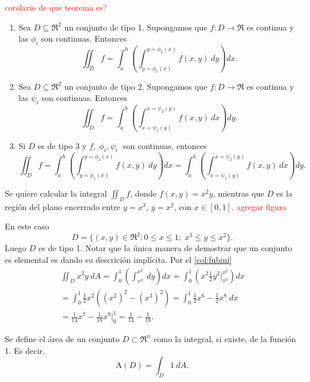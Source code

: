 \begin{corollary} \label{col:fubini}
    \textcolor{red}{corolario de que teorema es?}
    \begin{enumerate}
        \item Sea $D\subseteq\Re^2$ un conjunto de tipo 1. Supongamos que $f:D\to\Re$ es continua y las $\phi_i$ son continuas. Entonces
        \[
            \iint_D f=\int_a^b\left(\int_{y=\phi_1(x)}^{y=\phi_2(x)}f(x,y)\:dy\right)dx.  
        \]
        \item Sea $D\subseteq\Re^2$ un conjunto de tipo 2. Supongamos que $f:D\to\Re$ es continua y las $\psi_i$ son continuas. Entonces
        \[
            \iint_D f=\int_a^b\left(\int_{x=\psi_1(y)}^{x=\psi_2(y)}f(x,y)\:dx\right)dy.  
        \]
        \item Si $D$ es de tipo 3 y $f,\;\phi_i,\psi_i\;$ son continuas, entonces 
        \[
            \iint_D f=\int_a^b\left(\int_{y=\phi_1(x)}^{y=\phi_2(x)}f(x,y)\:dy\right)dx=\int_a^b\left(\int_{x=\psi_1(y)}^{x=\psi_2(y)}f(x,y)\:dx\right)dy. 
        \]
    \end{enumerate}
\end{corollary}
\begin{example}
    Se quiere calcular la integral $\iint_D f$, donde $f(x,y)=x^2y$, mientras que $D$ es la regi\'on del plano encerrado entre $y=x^3$, $y=x^2$, con $x\in[0,1]$. \textcolor{red}{agregar figura}

    En este caso 
    \[
        D=\{(x,y)\in\Re^2:0\leq x\leq1;\;x^3\leq y\leq x^2\}.  
    \]
    Luego $D$ es de tipo 1. Notar que la \'unica manera de demostrar que un conjunto es elemental es dando su descrici\'on impl\'icita. Por el \autoref{col:fubini}
    \begin{gather*}
        \iint_D x^2y\:dA=\int_0^1\left(\int_{x^3}^{x^2}\:dy\right)dx=\int_0^1\left(x^2\frac{1}{2}y^2\Big\lvert_{x^3}^{x^2}\right)dx\\
        =\int_0^1\frac{1}{2}x^2\left((x^2)^2-(x^3)^2\right)=\int_0^1\frac{1}{2}x^6-\frac{1}{2}x^8\;dx\\=\frac{1}{14}x^7-\frac{1}{18}x^9\Big\lvert_0^1=\frac{1}{14}-\frac{1}{18}.
    \end{gather*}
\end{example}
\begin{definition} %
    Se define el \'area de un conjunto $D\subset\Re^n$ como la integral, si existe, de la funci\'on 1. Es decir,
    \[
        \text{A}(D)=\int_D1\:dA.  
    \]
\end{definition}
